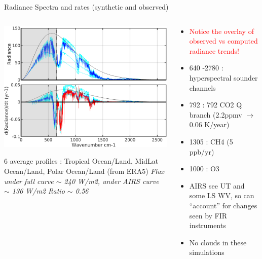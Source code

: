 \documentclass[10pt,t]{beamer}
\begin{document}
\begin{frame}{Radiance Spectra and rates (synthetic and observed)}

\vspace{-0.1in}
\begin{columns}

\begin{column}{0.55\columnwidth}
\begin{center}
\includegraphics[width=0.9\linewidth]{NEWFIGS/kcarta_0_3000__radtrends.png}
\end{center}
6 average profiles : Tropical Ocean/Land, MidLat Ocean/Land, Polar Ocean/Land (from ERA5) \newline
\emph{Flux under full curve $\sim$ 240 W/m2, under AIRS curve $\sim$ 136 W/m2 \newline
Ratio $\sim$ 0.56}
\end{column}

\begin{column}{0.55\columnwidth}
\begin{itemize}
  \item \textcolor{red}{Notice the overlay of observed vs computed radiance trends!}
  \item 640 -2780 \wn : hyperspectral sounder channels
  \item 792 \wn : 792 CO2 Q branch (2.2ppmv $\rightarrow$ 0.06 K/year)
  \item 1305 \wn : CH4 (5 ppb/yr)
  \item 1000 \wn : O3
  \item AIRS see UT and some LS WV, so can ``account'' for changes seen by FIR instruments
  \item No clouds in these simulations
\end{itemize}
\end{column}
\end{columns}
\end{frame}
\end{document}
